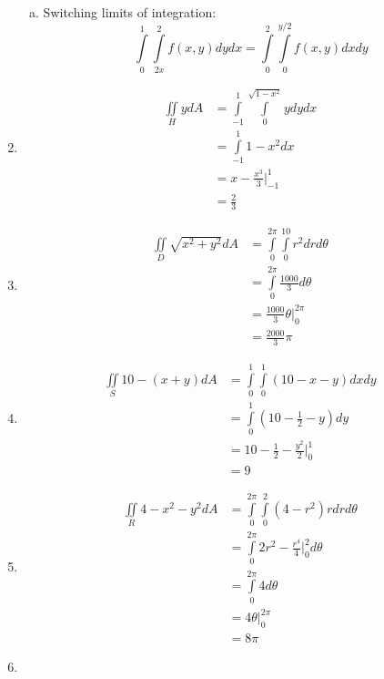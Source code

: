 \documentclass{article}
\begin{document}
\begin{enumerate}[1.]
\begin{enumerate}[a.]
      \item Switching limits of integration:
        $$ \int\limits_{0}^{1}\int\limits_{2x}^{2} f(x, y) dy dx =
        \int\limits_{0}^{2}\int\limits_{0}^{y/2} f(x, y) dx dy $$
    \end{enumerate}
  \item \begin{align*}
      \iint\limits_{H} y dA &= \int\limits_{-1}^{1}\int\limits_{0}^{\sqrt{1 -
      x^{2}}} y dy dx \\
      &= \int\limits_{-1}^{1} 1 - x^{2} dx \\
      &= x - \frac{ x^{3} }{ 3 } \bigg\vert_{-1}^{1} \\
      &= \frac{ 2 }{ 3 }
    \end{align*}
  \item \begin{align*}
      \iint\limits_{D} \sqrt{x^{2} + y^{2}} dA &=
      \int\limits_{0}^{2\pi}\int\limits_{0}^{10} r^{2} dr d\theta \\
      &= \int\limits_{0}^{2\pi} \frac{ 1000 }{ 3 } d\theta \\
      &= \frac{ 1000 }{ 3 } \theta \bigg\vert_{0}^{2\pi} \\
      &= \frac{ 2000 }{ 3 } \pi
    \end{align*}
  \item \begin{align*}
      \iint\limits_{S} 10 - (x + y) dA &= \int\limits_{0}^{1}\int\limits_{0}^{1}
      (10 - x - y) dx dy \\
      &= \int\limits_{0}^{1} \left( 10 - \frac{ 1 }{ 2 } - y \right) dy \\
      &= 10 - \frac{ 1 }{ 2 } - \frac{ y^{2} }{ 2 } \bigg\vert_{0}^{1} \\
      &= 9
    \end{align*}
  \item \begin{align*}
      \iint\limits_{R} 4 - x^{2}-y^{2}dA &=
      \int\limits_{0}^{2\pi}\int\limits_{0}^{2}(4 -
      r^{2})r dr d\theta \\
      &= \int\limits_{0}^{2\pi} 2r^{2} - \frac{ r^{4} }{ 4 }
      \bigg\vert_{0}^{2}d\theta \\
      &= \int\limits_{0}^{2\pi} 4 d\theta \\
      &= 4\theta \bigg\vert_{0}^{2\pi} \\
      &= 8 \pi
    \end{align*}
  \item \begin{align*}

\end{align*}
\end{enumerate}
\end{document}

